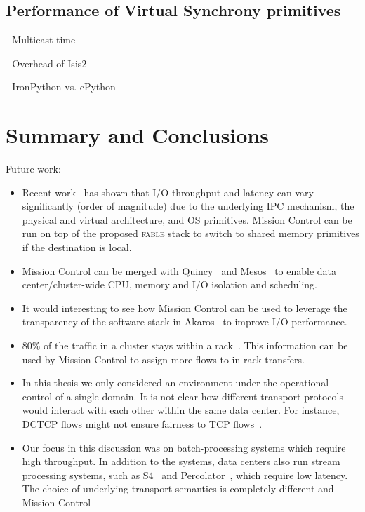 \documentclass[a4paper,12pt,twoside,openright]{report}
\begin{document}
\section{Performance of Virtual Synchrony primitives}
- Multicast time

- Overhead of Isis2

- IronPython vs. cPython

\chapter{Summary and Conclusions}\label{chapter:conclusion}

Future work:

\begin{itemize}
  \item Recent work~\cite{Smith:2012:TCF} has shown that I/O throughput
	and latency can vary significantly (order of magnitude) due to the underlying
	IPC mechanism, the physical and virtual architecture, and OS primitives.
	Mission Control can be run on top of the proposed \textsc{fable} stack to
	switch to shared memory primitives if the destination is local.
   \item Mission Control can be merged with Quincy~\cite{Isard:2009:QFS} and
   Mesos~\cite{Hindman:2011:MPF} to enable data center/cluster-wide CPU, memory
   and I/O isolation and scheduling.
   \item It would interesting to see how Mission Control can be used to leverage
   the transparency of the software stack in Akaros~\cite{Rhoden:2011:IPE} to
   improve I/O performance.
   \item 80\% of the traffic in a cluster stays within a
   rack~\cite{Benson:2010:NTC}. This information can be used by Mission Control
   to assign more flows to in-rack transfers.
   \item In this thesis we only considered an environment under the operational
	control of a single domain. It is not clear how different transport protocols
	would interact with each other within the same data center. For instance,
	DCTCP flows might not ensure fairness to TCP flows~\cite{Alizadeh:2010:DCT}.
	\item Our focus in this discussion was on batch-processing systems which
	require high throughput. In addition to the systems, data centers also run
	stream processing systems, such as S4~\cite{Neumeyer:2010:SDS} and
	Percolator~\cite{Peng:2010:LIP}, which require low latency. The choice of
	underlying transport semantics is completely different and Mission Control

\end{itemize}
\end{document}

